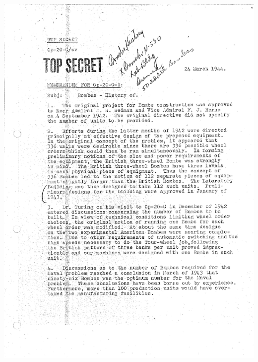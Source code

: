 \documentclass[%
11pt,%
twoside,%
titlepage,%
german,%
headsepline%
]{scrartcl}
\begin{document}
\includegraphics[width=1\textwidth,page=2]{pictures/memorandumbombes.pdf}

\cleardoublepage
\listoffigures
\listoftables
%
%
\end{document}
